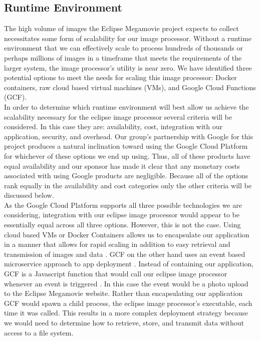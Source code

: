 \documentclass[10pt, onecolumn, draftclsnofoot, letterpaper, compsoc]{IEEEtran}
\begin{document}
\subsection{Runtime Environment}

The high volume of images the Eclipse Megamovie project expects to collect
necessitates some form of scalability for our image processor. Without a runtime
environment that we can effectively scale to process hundreds of thousands or
perhaps millions of images in a timeframe that meets the requirements of the
larger system, the image processor's utility is near zero. We have identified
three potential options to meet the needs for scaling this image processor:
Docker containers, raw cloud based virtual machines (VMs), and Google Cloud
Functions (GCF).\\

In order to determine which runtime environment will best allow us achieve the
scalability necessary for the eclipse image processor several criteria will be
considered. In this case they are: availability, cost, integration with our
application, security, and overhead. Our group's partnership with Google for
this project produces a natural inclination toward using the Google Cloud
Platform for whichever of these options we end up using. Thus, all of these
products have equal availability and our sponsor has made it clear that any
monetary costs associated with using Google products are negligible. Because all
of the options rank equally in the availability and cost categories only the
other criteria will be discussed below. \\

As the Google Cloud Platform supports all three possible technologies we are
considering, integration with our eclipse image processor would appear to be
essentially equal across all three options. However, this is not the case. Using
cloud based VMs or Docker Containers allows us to encapsulate our application
in a manner that allows for rapid scaling in addition to easy retrieval and
transmission of images and data \cite{docker, gcp}. GCF on the other hand uses
an event based microservice approach to app deployment \cite{gcp}. Instead of
containing our application, GCF is a Javascript function that would call our
eclipse image processor whenever an event is triggered \cite{gcp}. In this case
the event would be a photo upload to the Eclipse Megamovie website. Rather than
encapsulating our application GCF would spawn a child process, the eclipse image
processor's executable, each time it was called. This results in a more complex
deployment strategy because we would need to determine how to retrieve, store,
and transmit data without access to a file system. \\
\end{document}
